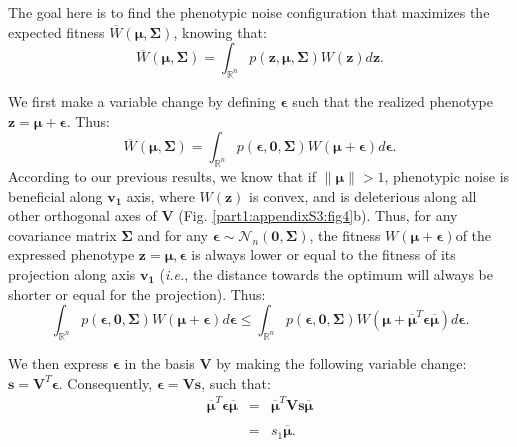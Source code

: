 The goal here is to find the phenotypic noise configuration that maximizes the expected fitness $\overline{W}(\boldsymbol{\mu}, \boldsymbol{\Sigma})$, knowing that:
\begin{equation}
\overline{W}(\boldsymbol{\mu}, \boldsymbol{\Sigma}) = \int_{\mathbb{R}^n} p(\boldsymbol{z},\boldsymbol{\mu},\boldsymbol{\Sigma})W(\boldsymbol{z})d\boldsymbol{z}.
\end{equation}

We first make a variable change by defining $\boldsymbol{\epsilon}$ such that the realized phenotype $\boldsymbol{z} = \boldsymbol{\mu}+\boldsymbol{\epsilon}$. Thus:
\begin{equation}
\overline{W}(\boldsymbol{\mu}, \boldsymbol{\Sigma}) = \int_{\mathbb{R}^n} p(\boldsymbol{\epsilon},\boldsymbol{0},\boldsymbol{\Sigma})W(\boldsymbol{\mu}+\boldsymbol{\epsilon})d\boldsymbol{\epsilon}.
\label{eq:part1:Wbar_epsilon}
\end{equation}
According to our previous results, we know that if $\lVert \boldsymbol{\mu} \rVert > 1$, phenotypic noise is beneficial along $\boldsymbol{v_1}$ axis, where $W(\boldsymbol{z})$ is convex, and is deleterious along all other orthogonal axes of $\boldsymbol{V}$ (Fig. \ref{part1:appendixS3:fig4}b).
Thus, for any covariance matrix $\boldsymbol{\Sigma}$ and for any $\boldsymbol{\epsilon} \sim \mathcal{N}_n(\boldsymbol{0},\boldsymbol{\Sigma})$, the fitness $W(\boldsymbol{\mu}+\boldsymbol{\epsilon})$of the expressed phenotype $\boldsymbol{z} = \boldsymbol{\mu},\boldsymbol{\epsilon}$ is always lower or equal to the fitness of its projection along axis $\boldsymbol{v_1}$ (\textit{i.e.}, the distance towards the optimum will always be shorter or equal for the projection). Thus:
\begin{equation}
\int_{\mathbb{R}^n} p(\boldsymbol{\epsilon},\boldsymbol{0},\boldsymbol{\Sigma})W(\boldsymbol{\mu}+\boldsymbol{\epsilon})d\boldsymbol{\epsilon}
\leq
\int_{\mathbb{R}^n} p(\boldsymbol{\epsilon},\boldsymbol{0},\boldsymbol{\Sigma})W(\boldsymbol{\mu}+\overline{\boldsymbol{\mu}}^T\boldsymbol{\epsilon}\overline{\boldsymbol{\mu}})d\boldsymbol{\epsilon}.
\label{eq:part1:inequality1}
\end{equation}

We then express $\boldsymbol{\epsilon}$ in the basis $\boldsymbol{V}$ by making the following variable change: $\boldsymbol{s} = \boldsymbol{V}^T \boldsymbol{\epsilon}$. Consequently, $\boldsymbol{\epsilon} = \boldsymbol{V}\!\boldsymbol{s}$, such that:
\begin{equation}
\begin{array}{rcl}
\overline{\boldsymbol{\mu}}^T\boldsymbol{\epsilon}\overline{\boldsymbol{\mu}} & = & \overline{\boldsymbol{\mu}}^T\boldsymbol{V}\boldsymbol{s}\overline{\boldsymbol{\mu}}\\\\
& = & s_1 \overline{\boldsymbol{\mu}}.
\end{array}
\end{equation}

